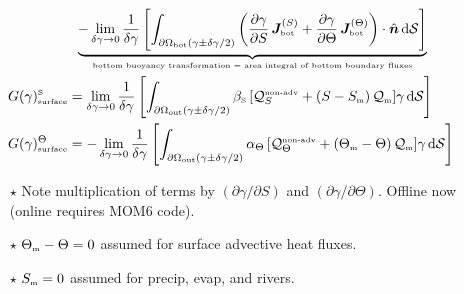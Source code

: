 \documentclass[10pt]{beamer}
\begin{document}
\begin{frame}
\begin{align*}
\\
 & \; \; 
  \underbrace{
 -\lim_{\delta \gamma \rightarrow 0}
 \frac{1}{\delta \gamma}
 \left[ \int_{\partial \Omega_{\mbox{\tiny bot}} (\gamma \pm \delta \gamma/2)} 
 \left(  \frac{\partial \gamma}{\partial S} \, {\bm J}^{(S)}_{\mbox{\tiny bot}}  
     +   \frac{\partial \gamma}{\partial \Theta} \, {\bm J}^{(\Theta)}_{\mbox{\tiny bot}}  
  \right)
  \cdot \hat{\bm n} \, \mathrm{d}\mathcal{S}
  \right]
 }_{\mbox{\tiny bottom buoyancy transformation = area integral of bottom boundary fluxes}}
\\
G(\gamma)_{\mbox{\tiny surface}}^{\mbox{\tiny S}} &=
 \lim_{\delta \gamma \rightarrow 0}
 \frac{1}{\delta \gamma}
 \left[ \int_{\partial \Omega_{\mbox{\tiny out}} (\gamma \pm \delta \gamma/2)} 
  \beta_{\mbox{\tiny S}} \, 
          [\mathcal{Q}_{S}^{\mbox{\tiny non-adv}} + (S -  S_{\mbox{\tiny m}} ) \, \mathcal{Q}_{\mbox{\tiny m}}]  
  \gamma \, \mathrm{d}\mathcal{S}
  \right]
\\
G(\gamma)_{\mbox{\tiny surface}}^{\Theta} &=
 -\lim_{\delta \gamma \rightarrow 0}
 \frac{1}{\delta \gamma}
 \left[ \int_{\partial \Omega_{\mbox{\tiny out}} (\gamma \pm \delta \gamma/2)} 
  \alpha_{\Theta} \, 
       [\mathcal{Q}_{\Theta}^{\mbox{\tiny non-adv}} +  (\Theta_{\mbox{\tiny m}}-\Theta) \, \mathcal{Q}_{\mbox{\tiny m}}]
  \gamma \, \mathrm{d}\mathcal{S}
  \right]
\end{align*}

\scriptsize 
\begin{itemize}

\item[$\star$] Note multiplication of terms by
  $(\partial \gamma/\partial S)$ and
  $(\partial \gamma/\partial \Theta)$. Offline now (online requires
  MOM6 code).

\item[$\star$] $\Theta_{\mbox{\tiny m}}-\Theta = 0$ assumed for surface advective heat fluxes. 

\item[$\star$] $S_{\mbox{\tiny m}} = 0$ assumed for precip, evap, and rivers. 

\end{itemize}

\end{frame}
\end{document}
